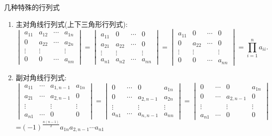 \documentclass[8pt a4paper, oneside, UTF8]{ctexbook}
\begin{document}
\begin{sloppypar}
\begin{criterion}{几种特殊的行列式}{}
\begin{enumerate}
            \item 主对角线行列式(上下三角形行列式):$$\begin{vmatrix}a_{11}&a_{12}&\cdots&a_{1n}\\0&a_{22}&\cdots&a_{2n}\\\vdots&\vdots&&\vdots\\0&0&\cdots&a_{nn}\end{vmatrix}=\begin{vmatrix}a_{11}&0&\cdots&0\\a_{21}&a_{22}&\cdots&0\\\vdots&\vdots&&\vdots\\a_{n1}&a_{n2}&\cdots&a_{nn}\end{vmatrix}=\begin{vmatrix}a_{11}&0&\cdots&0\\0&a_{22}&\cdots&0\\\vdots&\vdots&&\vdots\\0&0&\cdots&a_{nn}\end{vmatrix}=\prod_{i=1}^na_{ii} .$$
            \item 副对角线行列式:$$\begin{vmatrix}a_{11}&\cdots&a_{1,n-1}&a_{1n}\\a_{21}&\cdots&a_{2,n-1}&0\\\vdots&&\vdots&\vdots\\a_{n1}&\cdots&0&0\end{vmatrix}=\begin{vmatrix}0&\cdots&0&a_{1n}\\0&\cdots&a_{2,n-1}&a_{2n}\\\vdots&&\vdots&\vdots\\a_{n1}&\cdots&a_{n,n-1}&a_{nn}\end{vmatrix}=\begin{vmatrix}0&\cdots&0&a_{1n}\\0&\cdots&a_{2,n-1}&0\\\vdots&&\vdots&\vdots\\a_{n1}&\cdots&0&0\end{vmatrix} $$=$(-1)^{\frac{n(n-1)}{2}}a_{1n}a_{2,n-1}\cdots a_{n1}$

\end{enumerate}
\end{criterion}
\end{sloppypar}
\end{document}
